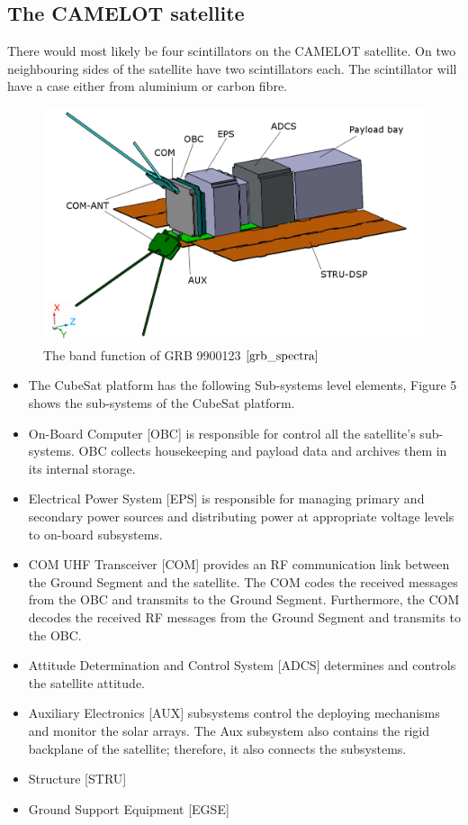 \documentclass[12pt, a4paper,titlepage]{article}
\numberwithin{equation}{section}
\numberwithin{figure}{section}
\begin{document}
\subsection{The CAMELOT satellite}

There would most likely be four scintillators on the CAMELOT satellite. On two neighbouring sides of the satellite have two scintillators each. The scintillator will have a case either from aluminium or carbon fibre.

\begin{figure}[H]
\centering
\includegraphics[width=130.0mm]{images/satellite_modules.png}
\caption{The band function of GRB 9900123 $\cite{grb_spectra}$}
\end{figure}

\begin{itemize}
\item The CubeSat platform has the following Sub-systems level elements, Figure 5 shows the sub-systems
of the CubeSat platform.
\item On-Board Computer [OBC] is responsible for control all the satellite’s sub-systems. OBC collects housekeeping and payload data and archives them in its internal storage.
\item Electrical Power System [EPS] is responsible for managing primary and secondary power sources and distributing power at appropriate voltage levels to on-board subsystems.
\item COM UHF Transceiver [COM] provides an RF communication link between the Ground Segment and the satellite. The COM codes the received messages from the OBC and transmits to the Ground Segment. Furthermore, the COM decodes the received RF messages from the Ground Segment and transmits to the OBC.
\item Attitude Determination and Control System [ADCS] determines and controls the satellite attitude.
\item Auxiliary Electronics [AUX] subsystems control the deploying mechanisms and monitor the
solar arrays. The Aux subsystem also contains the rigid backplane of the satellite; therefore, it also connects the subsystems.
\item Structure [STRU]
\item Ground Support Equipment [EGSE]
\end{itemize}
\end{document}
